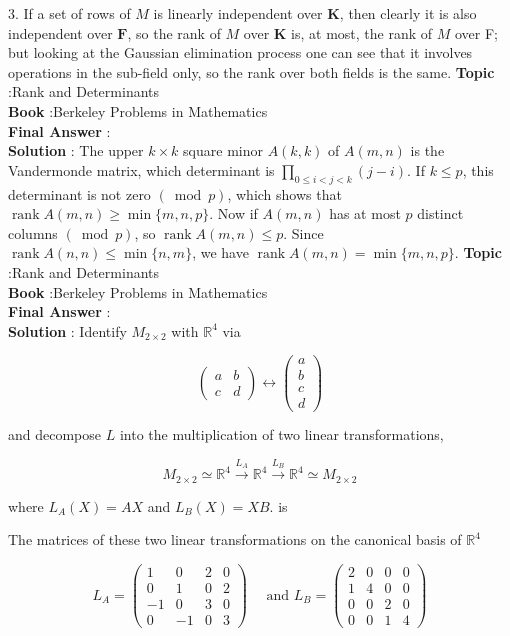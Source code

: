 \documentclass[10pt]{article}
\begin{document}
3. If a set of rows of $M$ is linearly independent over $\mathbf{K}$, then clearly it is also independent over $\mathbf{F}$, so the rank of $M$ over $\mathbf{K}$ is, at most, the rank of $M$ over F; but looking at the Gaussian elimination process one can see that it involves operations in the sub-field only, so the rank over both fields is the same.
\textbf{Topic} :Rank and Determinants \\
\textbf{Book} :Berkeley Problems in Mathematics\\
\textbf{Final Answer} :\\


\textbf{Solution} : The upper $k \times k$ square minor $A(k, k)$ of $A(m, n)$ is the Vandermonde matrix, which determinant is $\prod_{0 \leqslant i<j<k}(j-i)$. If $k \leqslant p$, this determinant is not zero $(\bmod p)$, which shows that $\operatorname{rank} A(m, n) \geqslant \min \{m, n, p\}$. Now if $A(m, n)$ has at most $p$ distinct columns $(\bmod p)$, so $\operatorname{rank} A(m, n) \leqslant p$. Since $\operatorname{rank} A(n, n) \leqslant \min \{n, m\}$, we have $\operatorname{rank} A(m, n)=\min \{m, n, p\}$.
\textbf{Topic} :Rank and Determinants \\
\textbf{Book} :Berkeley Problems in Mathematics\\
\textbf{Final Answer} :\\


\textbf{Solution} : Identify $M_{2 \times 2}$ with $\mathbb{R}^{4}$ via

$$
\left(\begin{array}{ll}
a & b \\
c & d
\end{array}\right) \leftrightarrow\left(\begin{array}{l}
a \\
b \\
c \\
d
\end{array}\right)
$$

and decompose $L$ into the multiplication of two linear transformations,

$$
M_{2 \times 2} \simeq \mathbb{R}^{4} \stackrel{L_{A}}{\longrightarrow} \mathbb{R}^{4} \stackrel{L_{B}}{\longrightarrow} \mathbb{R}^{4} \simeq M_{2 \times 2}
$$

where $L_{A}(X)=A X$ and $L_{B}(X)=X B$. is

The matrices of these two linear transformations on the canonical basis of $\mathbb{R}^{4}$

$$
L_{A}=\left(\begin{array}{rrrr}
1 & 0 & 2 & 0 \\
0 & 1 & 0 & 2 \\
-1 & 0 & 3 & 0 \\
0 & -1 & 0 & 3
\end{array}\right) \quad \text { and } L_{B}=\left(\begin{array}{llll}
2 & 0 & 0 & 0 \\
1 & 4 & 0 & 0 \\
0 & 0 & 2 & 0 \\
0 & 0 & 1 & 4
\end{array}\right)
$$
\end{document}

